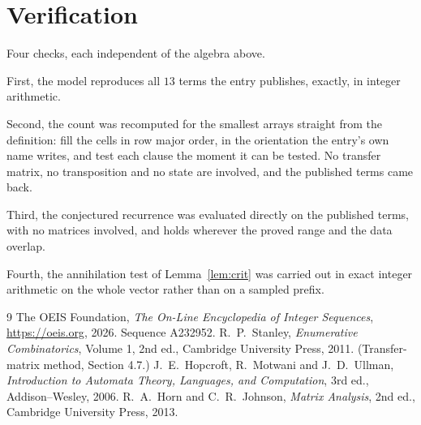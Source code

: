 \documentclass[11pt,a4paper]{article}
\theoremstyle{plain}
\theoremstyle{definition}
\begin{document}
\section{Verification}

Four checks, each independent of the algebra above.

First, the model reproduces all $13$ terms the entry publishes, exactly, in integer
arithmetic.

Second, the count was recomputed for the smallest arrays straight from the definition: fill the
cells in row major order, in the orientation the entry's own name writes, and test each clause
the moment it can be tested. No transfer matrix, no transposition and no state are involved,
and the published terms came back.

Third, the conjectured recurrence was evaluated directly on the published terms, with no
matrices involved, and holds wherever the proved range and the data overlap.

Fourth, the annihilation test of Lemma~\ref{lem:crit} was carried out in exact integer
arithmetic on the whole vector rather than on a sampled prefix.

\begin{thebibliography}{9}
 The OEIS Foundation, \emph{The On-Line Encyclopedia of Integer
Sequences}, \url{https://oeis.org}, 2026. Sequence A232952.
 R.~P.~Stanley, \emph{Enumerative Combinatorics}, Volume 1, 2nd ed.,
Cambridge University Press, 2011. (Transfer-matrix method, Section 4.7.)
 J.~E.~Hopcroft, R.~Motwani and J.~D.~Ullman, \emph{Introduction to Automata
Theory, Languages, and Computation}, 3rd ed., Addison--Wesley, 2006.
 R.~A.~Horn and C.~R.~Johnson, \emph{Matrix Analysis}, 2nd ed., Cambridge
University Press, 2013.
\end{thebibliography}
\end{document}
